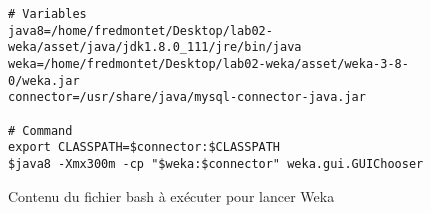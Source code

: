 \begin{figure}[H]
\centering
\begin{lstlisting}
# Variables
java8=/home/fredmontet/Desktop/lab02-weka/asset/java/jdk1.8.0_111/jre/bin/java
weka=/home/fredmontet/Desktop/lab02-weka/asset/weka-3-8-0/weka.jar
connector=/usr/share/java/mysql-connector-java.jar

# Command
export CLASSPATH=$connector:$CLASSPATH
$java8 -Xmx300m -cp "$weka:$connector" weka.gui.GUIChooser
\end{lstlisting}
\caption{Contenu du fichier bash à exécuter pour lancer Weka}
\label{lst:shell}
\end{figure}
